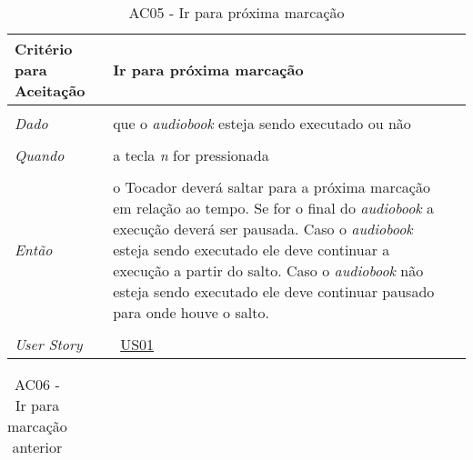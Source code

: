 \begin{apendicesenv}
\begin{table}[ht]
\begin{center}
\begin{tabularx}{\textwidth}{|lX|l|}
\end{tabularx}
\end{center}
\label{tab:us01a4}
\end{table}


\begin{table}[ht]
\centering
\caption{AC05 - Ir para próxima marcação}
\vspace{0.1cm}
\begin{center}
\begin{tabularx}{\textwidth}{|lX|l|}

\hline
\textbf{Critério para Aceitação} & Ir para próxima marcação \\
\hline
 & \\
\textit{Dado} & que o \textit{audiobook} esteja sendo executado ou não \\
 & \\
\textit{Quando} & a tecla \textit{n} for pressionada \\
 & \\
\textit{Então} & o Tocador deverá saltar para a próxima marcação em relação ao tempo. Se for o final do \textit{audiobook} a execução deverá ser pausada. Caso o \textit{audiobook} esteja sendo executado ele deve continuar a execução a partir do salto. Caso o \textit{audiobook} não esteja sendo executado ele deve continuar pausado para onde houve o salto. \\
 & \\
\hline
\textit{User Story} & ~\hyperref[tab:us01]{US01} \\
\hline

\end{tabularx}
\end{center}
\label{tab:us01a5}
\end{table}


\begin{table}[ht]
\centering
\caption{AC06 - Ir para marcação anterior}
\vspace{0.1cm}
\begin{center}
\begin{tabularx}{\textwidth}{|lX|l|}


\end{tabularx}
\end{center}
\end{table}
\end{apendicesenv}
